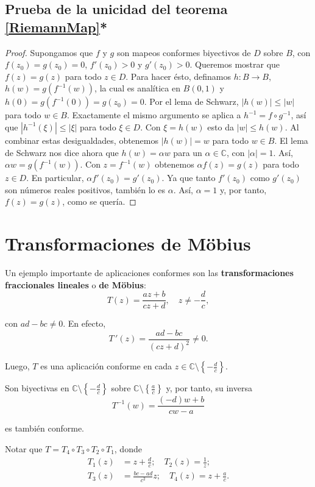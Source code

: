 \subsection*{Prueba de la unicidad del teorema \ref{RiemannMap}*}

\begin{proof}
Supongamos que $f$ y $g$ son mapeos conformes biyectivos de $D$ sobre $B$, con $f(z_0) = g(z_0) = 0$, $f'(z_0) > 0$ y $g'(z_0) > 0$. Queremos mostrar que $f(z) = g(z)$ para todo $z \in D$. Para hacer ésto, definamos $h: B \rightarrow B$, $h(w) = g(f^{-1}(w))$, la cual es analítica en $B(0,1)$ y $h(0) = g(f^{-1}(0)) = g(z_0) = 0$. Por el lema de Schwarz, $|h(w)|\leq |w|$ para todo $w \in B$. Exactamente el mismo argumento se aplica a $h^{-1} = f \circ g^{-1}$, así que $|h^{-1}(\xi)| \leq |\xi|$ para todo $\xi \in D$. Con $\xi = h(w)$ esto da $|w| \leq h(w)$. Al combinar estas desigualdades, obtenemos $|h(w)| = w$ para todo $w\in B$. El lema de Schwarz nos dice ahora que $h(w) = \alpha w$ para un $\alpha \in \mathbb{C}$, con $|\alpha| = 1$. Así, $\alpha w = g(f^{-1}(w))$. Con $z = f^{-1}(w)$ obtenemos $\alpha f(z) = g(z)$ para todo $z\in D$. En particular, $\alpha f'(z_0) = g'(z_0)$. Ya que tanto $f'(z_0)$ como $g'(z_0)$ son números reales positivos, también lo es $\alpha$. Así, $\alpha = 1$ y, por tanto, $f(z) = g(z)$, como se quería.
\end{proof}

\section{Transformaciones de Möbius}

Un ejemplo importante de aplicaciones conformes son las \textbf{transformaciones fraccionales lineales} o \textbf{de Möbius}:
$$T(z) = \frac{az+b}{cz+d}, \quad z \neq - \frac{d}{c},$$

con $ad-bc \neq 0$. En efecto,
$$T\,'(z) = \frac{ad-bc}{(cz+d)^2} \neq 0.$$

Luego, $T$ es una aplicación conforme en cada $z\in \mathbb{C} \setminus \left\{-\frac{d}{c} \right\}$.

Son biyectivas en $\mathbb{C}\setminus \left\{-\frac{d}{c} \right\}$ sobre $\mathbb{C}\setminus \left\{\frac{a}{c} \right\}$ y, por tanto, su inversa
$$T^{-1}(w) = \frac{(-d)w + b}{cw-a}$$

es también conforme.

Notar que $T = T_4 \circ T_3 \circ T_2 \circ T_1$, donde 
\begin{align*}
    T_1(z) &= z + \frac{d}{c}; \quad T_2(z) = \frac{1}{z}; \\
    T_3(z) &= \frac{bc-ad}{c^2}z; \quad  T_4(z) = z+ \frac{a}{c}.
\end{align*}


